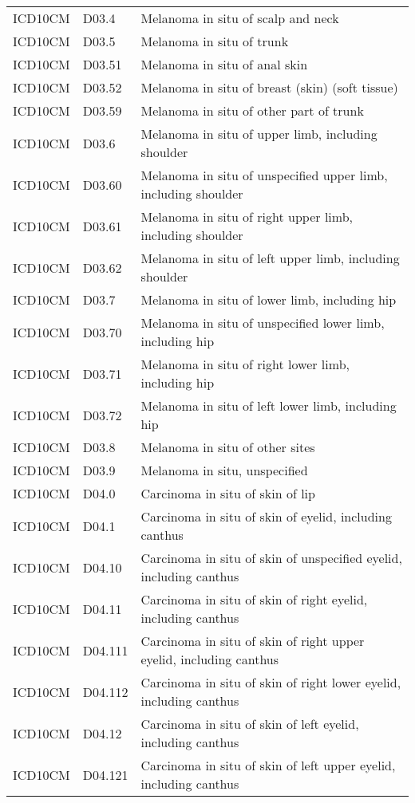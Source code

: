 \begin{longtable}{p{}p{}p{}}
  ICD10CM & D03.4 & Melanoma in situ of scalp and neck \\ 
  ICD10CM & D03.5 & Melanoma in situ of trunk \\ 
  ICD10CM & D03.51 & Melanoma in situ of anal skin \\ 
  ICD10CM & D03.52 & Melanoma in situ of breast (skin) (soft tissue) \\ 
  ICD10CM & D03.59 & Melanoma in situ of other part of trunk \\ 
  ICD10CM & D03.6 & Melanoma in situ of upper limb, including shoulder \\ 
  ICD10CM & D03.60 & Melanoma in situ of unspecified upper limb, including shoulder \\ 
  ICD10CM & D03.61 & Melanoma in situ of right upper limb, including shoulder \\ 
  ICD10CM & D03.62 & Melanoma in situ of left upper limb, including shoulder \\ 
  ICD10CM & D03.7 & Melanoma in situ of lower limb, including hip \\ 
  ICD10CM & D03.70 & Melanoma in situ of unspecified lower limb, including hip \\ 
  ICD10CM & D03.71 & Melanoma in situ of right lower limb, including hip \\ 
  ICD10CM & D03.72 & Melanoma in situ of left lower limb, including hip \\ 
  ICD10CM & D03.8 & Melanoma in situ of other sites \\ 
  ICD10CM & D03.9 & Melanoma in situ, unspecified \\ 
  ICD10CM & D04.0 & Carcinoma in situ of skin of lip \\ 
  ICD10CM & D04.1 & Carcinoma in situ of skin of eyelid, including canthus \\ 
  ICD10CM & D04.10 & Carcinoma in situ of skin of unspecified eyelid, including canthus \\ 
  ICD10CM & D04.11 & Carcinoma in situ of skin of right eyelid, including canthus \\ 
  ICD10CM & D04.111 & Carcinoma in situ of skin of right upper eyelid, including canthus \\ 
  ICD10CM & D04.112 & Carcinoma in situ of skin of right lower eyelid, including canthus \\ 
  ICD10CM & D04.12 & Carcinoma in situ of skin of left eyelid, including canthus \\ 
  ICD10CM & D04.121 & Carcinoma in situ of skin of left upper eyelid, including canthus \\ 

\end{longtable}

